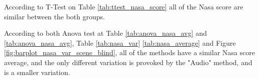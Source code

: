 According to T-Test on Table \ref{tab:ttest_nasa_score} all of the Nasa score are similar between the both groups.

According to both Anova test at Table \ref{tab:anova_nasa_avg} and \ref{tab:anova_nasa_avg}, Table \ref{tab:nasa_var} \ref{tab:nasa_average} and Figure \ref{fig:barplot_nasa_var_scene_blind}, all of the methods have a similar Nasa score average, and the only different variation is provoked by the "Audio" method, and is a smaller variation.

\FloatBarrier
